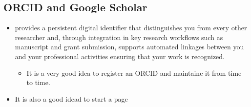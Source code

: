 \documentclass[letterpaper,10pt,english]{sphinxmanual}
\begin{document}
\subsection{ORCID and Google Scholar}
\label{\detokenize{resource/research/getting_started:orcid-and-google-scholar}}\begin{itemize}
\item {} 
 provides a persistent digital
identifier that distinguishes you from every other researcher and,
through integration in key research workflows such as manuscript and
grant submission, supports automated linkages between you and your
professional activities ensuring that your work is recognized.
\begin{itemize}
\item {} 
It is a very good idea to register an ORCID and maintaine it from
time to time.

\end{itemize}

\item {} 
It is also a good idead to start a  page

\end{itemize}
\end{document}
